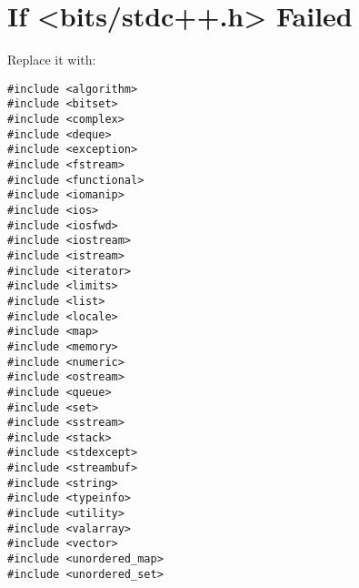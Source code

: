 \section{If <bits/stdc++.h> Failed}
Replace it with:
\begin{lstlisting}
#include <algorithm>
#include <bitset>
#include <complex>
#include <deque>
#include <exception>
#include <fstream>
#include <functional>
#include <iomanip>
#include <ios>
#include <iosfwd>
#include <iostream>
#include <istream>
#include <iterator>
#include <limits>
#include <list>
#include <locale>
#include <map>
#include <memory>
#include <numeric>
#include <ostream>
#include <queue>
#include <set>
#include <sstream>
#include <stack>
#include <stdexcept>
#include <streambuf>
#include <string>
#include <typeinfo>
#include <utility>
#include <valarray>
#include <vector>
#include <unordered_map>
#include <unordered_set>
\end{lstlisting}
